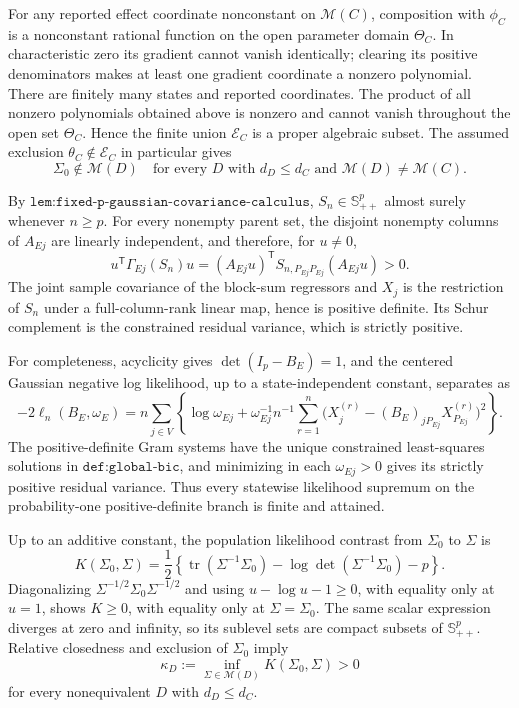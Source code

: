 For any reported effect coordinate nonconstant on \(\mathcal M(C)\), composition with \(\phi_C\) is a nonconstant rational function on the open parameter domain \(\Theta_C\). In characteristic zero its gradient cannot vanish identically; clearing its positive denominators makes at least one gradient coordinate a nonzero polynomial. There are finitely many states and reported coordinates. The product of all nonzero polynomials obtained above is nonzero and cannot vanish throughout the open set \(\Theta_C\). Hence the finite union \(\mathcal E_C\) is a proper algebraic subset. The assumed exclusion \(\theta_C\notin\mathcal E_C\) in particular gives
\[
 \Sigma_0\notin\mathcal M(D)
 \quad\text{for every }D\text{ with }d_D\leq d_C
 \text{ and }\mathcal M(D)\neq\mathcal M(C).
\]

By \(\texttt{lem:fixed-p-gaussian-covariance-calculus}\), \(S_n\in\mathbb S^p_{++}\) almost surely whenever \(n\geq p\). For every nonempty parent set, the disjoint nonempty columns of \(A_{Ej}\) are linearly independent, and therefore, for \(u\neq0\),
\[
 u^{\mathsf T}\Gamma_{Ej}(S_n)u
 =(A_{Ej}u)^{\mathsf T}S_{n,P_{Ej}P_{Ej}}(A_{Ej}u)>0.
\]
The joint sample covariance of the block-sum regressors and \(X_j\) is the restriction of \(S_n\) under a full-column-rank linear map, hence is positive definite. Its Schur complement is the constrained residual variance, which is strictly positive.

For completeness, acyclicity gives \(\det(I_p-B_E)=1\), and the centered Gaussian negative log likelihood, up to a state-independent constant, separates as
\[
 -2\ell_n(B_E,\omega_E)
 =n\sum_{j\in V}\left\{\log\omega_{Ej}
 +\omega_{Ej}^{-1}n^{-1}\sum_{r=1}^n
 \bigl(X_j^{(r)}-(B_E)_{jP_{Ej}}X_{P_{Ej}}^{(r)}\bigr)^2\right\}.
\]
The positive-definite Gram systems have the unique constrained least-squares solutions in \(\texttt{def:global-bic}\), and minimizing in each \(\omega_{Ej}>0\) gives its strictly positive residual variance. Thus every statewise likelihood supremum on the probability-one positive-definite branch is finite and attained.

Up to an additive constant, the population likelihood contrast from \(\Sigma_0\) to \(\Sigma\) is
\[
 K(\Sigma_0,\Sigma)=\frac12\left\{
 \operatorname{tr}(\Sigma^{-1}\Sigma_0)
 -\log\det(\Sigma^{-1}\Sigma_0)-p\right\}.
\]
Diagonalizing \(\Sigma^{-1/2}\Sigma_0\Sigma^{-1/2}\) and using \(u-\log u-1\geq0\), with equality only at \(u=1\), shows \(K\geq0\), with equality only at \(\Sigma=\Sigma_0\). The same scalar expression diverges at zero and infinity, so its sublevel sets are compact subsets of \(\mathbb S^p_{++}\). Relative closedness and exclusion of \(\Sigma_0\) imply
\[
 \kappa_D:=\inf_{\Sigma\in\mathcal M(D)}K(\Sigma_0,\Sigma)>0
\]
for every nonequivalent \(D\) with \(d_D\leq d_C\).

